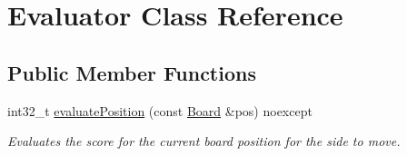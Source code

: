 \hypertarget{classEvaluator}{}\section{Evaluator Class Reference}
\label{classEvaluator}
\subsection*{Public Member Functions}
\begin{DoxyCompactItemize}
\item 
int32\+\_\+t \mbox{\hyperlink{classEvaluator_a82ac01bb85da704f7a9f1a059c0e91fb}{evaluate\+Position}} (const \mbox{\hyperlink{classBoard}{Board}} \&pos) noexcept
\begin{DoxyCompactList}\small\item\em Evaluates the score for the current board position for the side to move. \end{DoxyCompactList}\end{DoxyCompactItemize}

